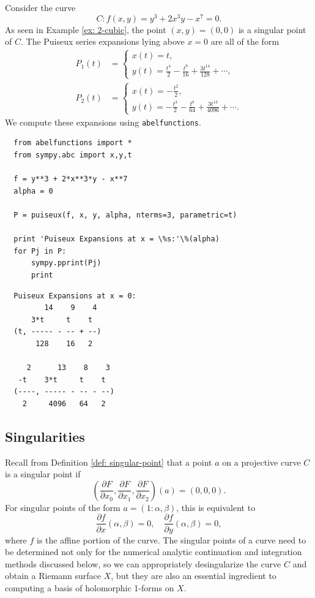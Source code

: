 \begin{example} \label{ex: 3-puiseux} Consider the curve
  \[
    C : f(x,y) = y^3 + 2x^3y - x^7 = 0.
  \]
  As seen in Example \ref{ex: 2-cubic}, the point $(x,y) = (0,0)$ is a singular
  point of $C$. The Puiseux series expansions lying above $x=0$ are all of the
  form
  \begin{align*}
    P_1(t) &= \begin{cases}
        x(t) = t, \\
        y(t) = \frac{t^{4}}{2} - \frac{t^{9}}{16} + \frac{3 t^{14}}{128} + \cdots,
      \end{cases} \\
    P_2(t) &= \begin{cases}
      x(t) = - \frac{t^{2}}{2}, \\
      y(t) =  - \frac{t^{3}}{2} - \frac{t^{8}}{64} + \frac{3 t^{13}}{4096} + \cdots.
    \end{cases}
  \end{align*}
  We compute these expansions using {\tt abelfunctions}.

  \begin{lstlisting}
  from abelfunctions import *
  from sympy.abc import x,y,t

  f = y**3 + 2*x**3*y - x**7
  alpha = 0

  P = puiseux(f, x, y, alpha, nterms=3, parametric=t)

  print 'Puiseux Expansions at x = \%s:'\%(alpha)
  for Pj in P:
      sympy.pprint(Pj)
      print
  \end{lstlisting}
  \begin{lstlisting}
  Puiseux Expansions at x = 0:
         14    9    4 
      3*t     t    t  
  (t, ----- - -- + --)
       128    16   2  

     2      13    8    3 
   -t    3*t     t    t  
  (----, ----- - -- - --)
    2     4096   64   2  
  \end{lstlisting}
\end{example}


\subsection{Singularities}\label{subsec:background-singularities}

Recall from Definition \ref{def: singular-point} that a point $a$ on a
projective curve $C$ is a singular point if
\[
  \left( \frac{\partial F}{\partial x_0}, \frac{\partial F}{\partial x_1},
    \frac{\partial F}{\partial x_2} \right) (a) = (0,0,0).
\]
For singular points of the form $a = (1 : \alpha, \beta)$, this is equivalent to
\[
  \frac{\partial f}{\partial x} (\alpha,\beta) = 0, \quad \frac{\partial
    f}{\partial y} (\alpha,\beta) = 0,
\]
where $f$ is the affine portion of the curve. The singular points of a curve
need to be determined not only for the numerical analytic continuation and
integration methods discussed below, so we can appropriately desingularize the
curve $C$ and obtain a Riemann surface $X$, but they are also an essential
ingredient to computing a basis of holomorphic 1-forms on $X$.

